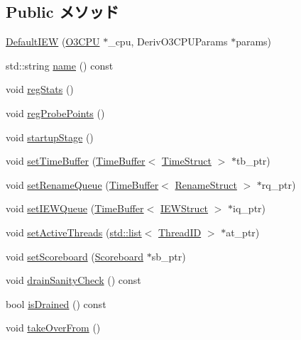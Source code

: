 \subsection*{Public メソッド}
\begin{DoxyCompactItemize}
\item 
\hyperlink{classDefaultIEW_a2440a84872425a3bfdbd6dfd37760345}{DefaultIEW} (\hyperlink{classDefaultIEW_a44622cf06940413482836cb62931ac3f}{O3CPU} $\ast$\_\-cpu, DerivO3CPUParams $\ast$params)
\item 
std::string \hyperlink{classDefaultIEW_a37627d5d5bba7f4a8690c71c2ab3cb07}{name} () const 
\item 
void \hyperlink{classDefaultIEW_a4dc637449366fcdfc4e764cdf12d9b11}{regStats} ()
\item 
void \hyperlink{classDefaultIEW_aa2dab17a363fd4307274d579796adcf7}{regProbePoints} ()
\item 
void \hyperlink{classDefaultIEW_a31d4cbdab16d4ff8d6bc7f84ece727da}{startupStage} ()
\item 
void \hyperlink{classDefaultIEW_a2b521ea5f191fff72265f60d4ed5187b}{setTimeBuffer} (\hyperlink{classTimeBuffer}{TimeBuffer}$<$ \hyperlink{structTimeStruct}{TimeStruct} $>$ $\ast$tb\_\-ptr)
\item 
void \hyperlink{classDefaultIEW_a701624f92a819fe4205faede6e614d9f}{setRenameQueue} (\hyperlink{classTimeBuffer}{TimeBuffer}$<$ \hyperlink{classDefaultIEW_a0c2a89ad2edad9ad605d0461f9b132a5}{RenameStruct} $>$ $\ast$rq\_\-ptr)
\item 
void \hyperlink{classDefaultIEW_a6b8bf7d75423c9bccd93d50470f7f935}{setIEWQueue} (\hyperlink{classTimeBuffer}{TimeBuffer}$<$ \hyperlink{classDefaultIEW_a7cf3f052f760b3a8a18623f792c10910}{IEWStruct} $>$ $\ast$iq\_\-ptr)
\item 
void \hyperlink{classDefaultIEW_aab96bdacf8bd420402cbb543f994e054}{setActiveThreads} (\hyperlink{classstd_1_1list}{std::list}$<$ \hyperlink{base_2types_8hh_ab39b1a4f9dad884694c7a74ed69e6a6b}{ThreadID} $>$ $\ast$at\_\-ptr)
\item 
void \hyperlink{classDefaultIEW_a6f43cb2e5396c650d07ea5e01e855c32}{setScoreboard} (\hyperlink{classScoreboard}{Scoreboard} $\ast$sb\_\-ptr)
\item 
void \hyperlink{classDefaultIEW_a0240eb42fa57fe5d3788093f62b77347}{drainSanityCheck} () const 
\item 
bool \hyperlink{classDefaultIEW_adf5473c18a3d7c1e88c4a2072bce5526}{isDrained} () const 
\item 
void \hyperlink{classDefaultIEW_a8674059ce345e23aac5086b2c3e24a43}{takeOverFrom} ()

\end{DoxyCompactItemize}
